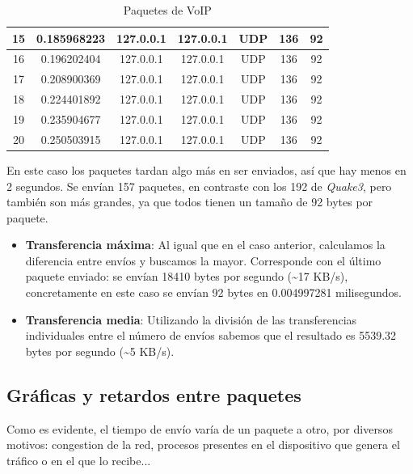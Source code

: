 \documentclass[11pt,a4paper]{article}
\begin{document}
\begin{table}[H]
\begin{tabular}{|c|c|c|c|c|c|c|}
15 & 0.185968223   & 127.0.0.1       & 127.0.0.1            & UDP               & 136             & 92                    \\ \hline
16 & 0.196202404   & 127.0.0.1       & 127.0.0.1            & UDP               & 136             & 92                    \\ \hline
17 & 0.208900369   & 127.0.0.1       & 127.0.0.1            & UDP               & 136             & 92                    \\ \hline
18 & 0.224401892   & 127.0.0.1       & 127.0.0.1            & UDP               & 136             & 92                    \\ \hline
19 & 0.235904677   & 127.0.0.1       & 127.0.0.1            & UDP               & 136             & 92                    \\ \hline
20 & 0.250503915   & 127.0.0.1       & 127.0.0.1            & UDP               & 136             & 92                    \\ \hline
\end{tabular}
\caption{Paquetes de VoIP}
\end{table}

En este caso los paquetes tardan algo más en ser enviados, así que hay menos en 2 segundos. Se envían 157 paquetes, en contraste con los 192 de \textit{Quake3}, pero también son más grandes, ya que todos tienen un tamaño de 92 bytes por paquete.

\begin{itemize}
	\item \textbf{Transferencia máxima}: Al igual que en el caso anterior, calculamos la diferencia entre envíos y buscamos la mayor. Corresponde con el último paquete enviado: se envían 18410 bytes por segundo (\textasciitilde 17 KB/s), concretamente en este caso se envían 92 bytes en 0.004997281 milisegundos.
	\item \textbf{Transferencia media}: Utilizando la división de las transferencias individuales entre el número de envíos sabemos que el resultado es 5539.32 bytes por segundo (\textasciitilde 5 KB/s).
\end{itemize}

\subsection{Gráficas y retardos entre paquetes}

Como es evidente, el tiempo de envío varía de un paquete a otro, por diversos motivos: congestion de la red, procesos presentes en el dispositivo que genera el tráfico o en el que lo recibe...\\
\end{document}
